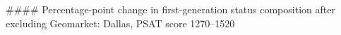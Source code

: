 #### Percentage-point change in first-generation status composition after excluding Geomarket: Dallas, PSAT score 1270–1520
